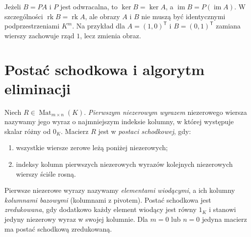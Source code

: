 \begin{uwaga}
\label{rem:lin5-obraz-wiersze}
Jeżeli \(B=PA\) i \(P\) jest odwracalna,
to \(\ker B=\ker A\), a
\(\operatorname{im}B=P(\operatorname{im}A)\).
W szczególności \(\operatorname{rk}B=\operatorname{rk}A\),
ale obrazy \(A\) i \(B\) nie muszą być
identycznymi podprzestrzeniami \(K^m\).
Na przykład dla
\(A=(1,0)^{\mathsf T}\) i \(B=(0,1)^{\mathsf T}\)
zamiana wierszy zachowuje rząd \(1\),
lecz zmienia obraz.
\end{uwaga}

\section{Postać schodkowa i algorytm eliminacji}
\label{sec:lin5-postac-schodkowa}

\begin{definicja}
\label{def:lin5-schodkowa}
Niech \(R\in\operatorname{Mat}_{m\times n}(K)\).
\emph{Pierwszym niezerowym wyrazem}
niezerowego wiersza nazywamy jego wyraz
o najmniejszym indeksie kolumny, w której
występuje skalar różny od \(0_K\).
Macierz \(R\) jest w \emph{postaci schodkowej},
gdy:
\begin{enumerate}[label=(\roman*)]
\item wszystkie wiersze zerowe leżą poniżej niezerowych;
\item indeksy kolumn pierwszych niezerowych wyrazów
kolejnych niezerowych wierszy ściśle rosną.
\end{enumerate}
Pierwsze niezerowe wyrazy nazywamy
\emph{elementami wiodącymi}, a ich kolumny
\emph{kolumnami bazowymi} (kolumnami z pivotem).
Postać schodkowa jest \emph{zredukowana},
gdy dodatkowo każdy element wiodący jest
równy \(1_K\) i stanowi jedyny niezerowy wyraz
w swojej kolumnie.
Dla \(m=0\) lub \(n=0\) jedyna macierz
ma postać schodkową zredukowaną.
\end{definicja}

